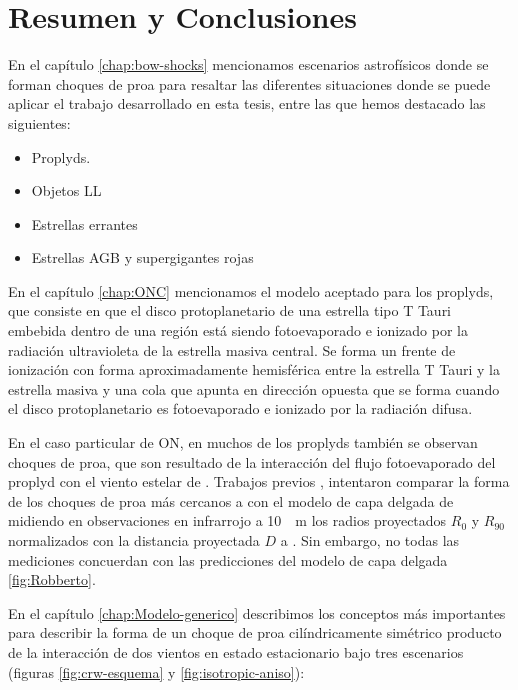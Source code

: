 \chapter{Resumen y Conclusiones}
\label{chap:conclusions}
\thispagestyle{empty}

En el capítulo \ref{chap:bow-shocks} mencionamos escenarios astrofísicos donde se forman choques de proa para resaltar las diferentes situaciones donde se puede aplicar el trabajo desarrollado en esta tesis, entre las que hemos destacado las siguientes:

\begin{itemize}
\item Proplyds.
\item Objetos LL
\item Estrellas errantes
\item Estrellas AGB y supergigantes rojas
\end{itemize}

En el capítulo \ref{chap:ONC} mencionamos el modelo aceptado para los proplyds, que consiste en que el disco protoplanetario de una estrella tipo T Tauri embebida dentro de una región  está siendo fotoevaporado e ionizado por la radiación ultravioleta de la estrella masiva central. Se forma un frente de ionización con forma aproximadamente hemisférica entre la estrella T Tauri y la estrella masiva y una cola que apunta en dirección opuesta que se forma cuando el disco protoplanetario es fotoevaporado e ionizado por la radiación difusa.

En el caso particular de ON, en muchos de los proplyds también se observan choques de proa, que son resultado de la interacción del flujo fotoevaporado del proplyd con el viento estelar de \thC{}. Trabajos previos \citep{Robberto:2005}, intentaron comparar la forma de los choques de proa más cercanos a \thC{} con el modelo de capa delgada de \citet{Canto:1996} midiendo en observaciones en infrarrojo a \SI{10}{\mu.m} los radios proyectados $R_0$ y $R_{90}$ normalizados con la distancia proyectada $D$ a \thC{}. Sin embargo, no todas las mediciones concuerdan con las predicciones del modelo de capa delgada \ref{fig:Robberto}.

En el capítulo \ref{chap:Modelo-generico} describimos los conceptos más importantes para describir la forma de un choque de proa cilíndricamente simétrico producto de la interacción de dos vientos en estado estacionario bajo tres escenarios (figuras \ref{fig:crw-esquema} y \ref{fig:isotropic-aniso}):

